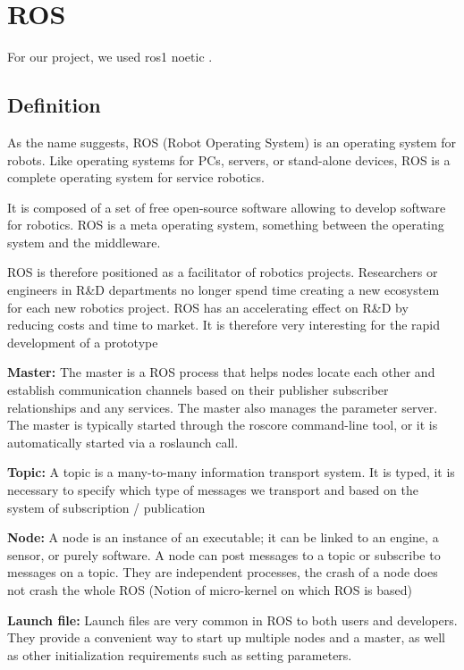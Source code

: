 \section{ROS}\insertloftspace
\setcounter{figure}{0}\setcounter{table}{0}

For our project, we used ros1 noetic \cite{ROS}.

\subsection{Definition}

As the name suggests, ROS (Robot Operating System) is an operating system for robots. Like operating systems for PCs, servers, or stand-alone devices, ROS is a complete operating system for service robotics.

\bigbreak
It is composed of a set of free open-source software allowing to develop software for robotics. ROS is a meta operating system, something between the operating system and the middleware.

\bigbreak
ROS is therefore positioned as a facilitator of robotics projects. Researchers or engineers in R\&D departments no longer spend time creating a new ecosystem for each new robotics project. ROS has an accelerating effect on R\&D by reducing costs and time to market. It is therefore very interesting for the rapid development of a prototype

\bigbreak
\textbf{Master:} The master is a ROS process that helps nodes locate each other and establish communication channels based on their publisher subscriber relationships and any services. The master also manages the parameter server. The master is typically started through the roscore command-line tool, or it is automatically started via a roslaunch call.

\bigbreak
\textbf{Topic:} A topic is a many-to-many information transport system. It is typed, it is necessary to specify which type of messages we transport and based on the system of subscription / publication 

\bigbreak
\textbf{Node:} A node is an instance of an executable; it can be linked to an engine, a sensor, or purely software. A node can post messages to a topic or subscribe to messages on a topic. They are independent processes, the crash of a node does not crash the whole ROS (Notion of micro-kernel on which ROS is based)

\bigbreak
\textbf{Launch file:} Launch files are very common in ROS to both users and developers. They provide a convenient way to start up multiple nodes and a master, as well as other initialization requirements such as setting parameters.

